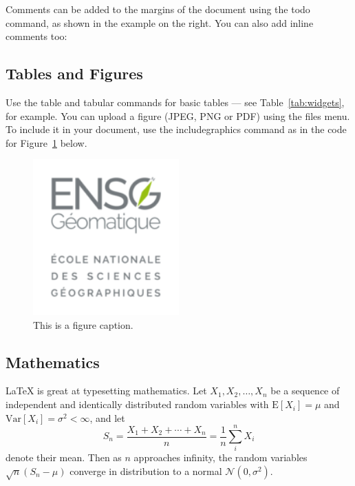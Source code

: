 Comments can be added to the margins of the document using the  todo command, as shown in the example on the right. You can also add inline comments too:


\subsection{Tables and Figures}

Use the table and tabular commands for basic tables --- see Table~\ref{tab:widgets}, for example. You can upload a figure (JPEG, PNG or PDF) using the files menu. To include it in your document, use the includegraphics command as in the code for Figure~\ref{fig:frog} below.

\begin{figure}
\centering
\includegraphics[width=0.5\textwidth]{../images/logo.png}
\caption{\label{fig:frog}This is a figure caption.}
\end{figure}


\subsection{Mathematics}

\LaTeX{} is great at typesetting mathematics. Let $X_1, X_2, \ldots, X_n$ be a sequence of independent and identically distributed random variables with $\text{E}[X_i] = \mu$ and $\text{Var}[X_i] = \sigma^2 < \infty$, and let
$$S_n = \frac{X_1 + X_2 + \cdots + X_n}{n}
      = \frac{1}{n}\sum_{i}^{n} X_i$$
denote their mean. Then as $n$ approaches infinity, the random variables $\sqrt{n}(S_n - \mu)$ converge in distribution to a normal $\mathcal{N}(0, \sigma^2)$.

